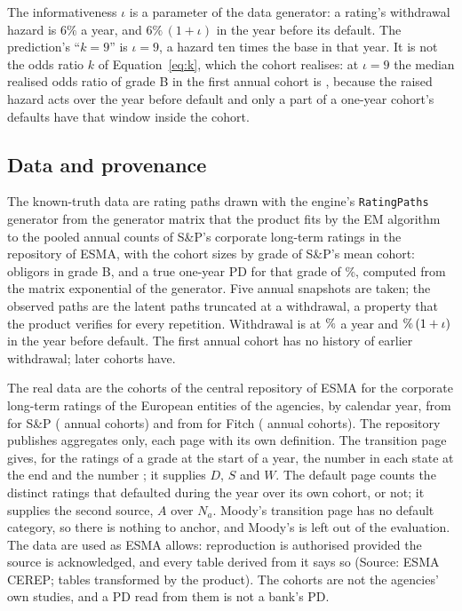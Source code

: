 The informativeness $\iota$ is a parameter of the data generator: a rating's withdrawal hazard is $6\%$ a year, and $6\%\,(1+\iota)$ in the year before its default. The prediction's ``$k=9$'' is $\iota=9$, a hazard ten times the base in that year. It is not the odds ratio $k$ of Equation~\eqref{eq:k}, which the cohort realises: at $\iota=9$ the median realised odds ratio of grade B in the first annual cohort is , because the raised hazard acts over the year before default and only a part of a one-year cohort's defaults have that window inside the cohort.

\subsection{Data and provenance}

The known-truth data are rating paths drawn with the engine's \texttt{RatingPaths} generator from the generator matrix that the product fits by the EM algorithm to the pooled annual counts of S\&P's corporate long-term ratings in the repository of ESMA, with the cohort sizes by grade of S\&P's mean cohort:  obligors in grade B, and a true one-year PD for that grade of \%, computed from the matrix exponential of the generator. Five annual snapshots are taken; the observed paths are the latent paths truncated at a withdrawal, a property that the product verifies for every repetition. Withdrawal is at $\nv{withdrawal.rate}\%$ a year and $\nv{withdrawal.rate}\%\,(1+\iota)$ in the year before default. The first annual cohort has no history of earlier withdrawal; later cohorts have.

The real data are the cohorts of the central repository of ESMA \citep{cerep} for the corporate long-term ratings of the European entities of the agencies, by calendar year, from  for S\&P ( annual cohorts) and from  for Fitch ( annual cohorts). The repository publishes aggregates only, each page with its own definition. The transition page gives, for the ratings of a grade at the start of a year, the number in each state at the end and the number \wdn{}; it supplies $D$, $S$ and $W$. The default page counts the distinct ratings that defaulted during the year over its own cohort, \wdn{} or not; it supplies the second source, $A$ over $N_a$. Moody's transition page has no default category, so there is nothing to anchor, and Moody's is left out of the evaluation. The data are used as ESMA allows: reproduction is authorised provided the source is acknowledged, and every table derived from it says so (Source: ESMA CEREP; tables transformed by the product). The cohorts are not the agencies' own studies, and a PD read from them is not a bank's PD.

